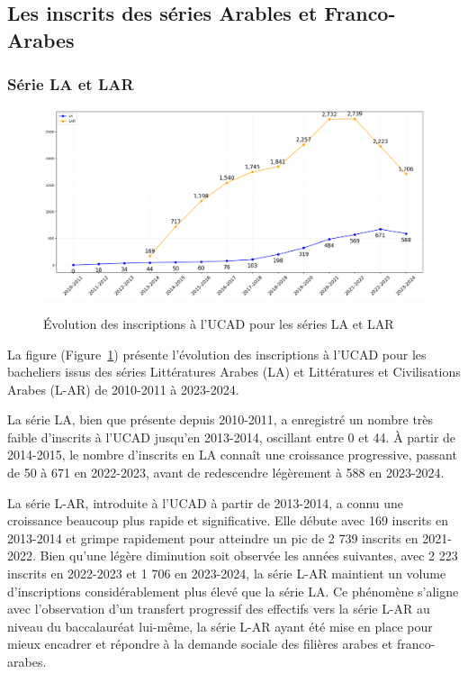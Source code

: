 \newpage
\subsection{Les inscrits des séries Arables et Franco-Arabes}

\subsubsection{Série LA et LAR}

\begin{figure}[ht]
\centering
\caption{Évolution des inscriptions à l'UCAD pour les séries LA et LAR}
\includegraphics[width=1\textwidth]{figure/Inscrits_ucad_LA_LAR.png}
\label{fig:inscrits_ucad_la_lar}
\end{figure}

La figure (Figure~\ref{fig:inscrits_ucad_la_lar}) présente l'évolution des inscriptions à l'UCAD pour les bacheliers issus des séries Littératures Arabes (LA) et Littératures et Civilisations Arabes (L-AR) de 2010-2011 à 2023-2024.

La série LA, bien que présente depuis 2010-2011, a enregistré un nombre très faible d'inscrits à l'UCAD jusqu'en 2013-2014, oscillant entre 0 et 44. 
À partir de 2014-2015, le nombre d'inscrits en LA connaît une croissance progressive, passant de 50 à 671 en 2022-2023, avant de redescendre légèrement à 588 en 2023-2024.

La série L-AR, introduite à l'UCAD à partir de 2013-2014, a connu une croissance beaucoup plus rapide et significative. Elle débute avec 169 inscrits en 2013-2014 et grimpe rapidement pour atteindre un pic de 2 739 inscrits en 2021-2022. 
Bien qu'une légère diminution soit observée les années suivantes, avec 2 223 inscrits en 2022-2023 et 1 706 en 2023-2024, la série L-AR maintient un volume d'inscriptions considérablement plus élevé que la série LA. 
Ce phénomène s'aligne avec l'observation d'un transfert progressif des effectifs vers la série L-AR au niveau du baccalauréat lui-même, la série L-AR ayant été mise en place pour mieux encadrer et répondre à la demande sociale des filières arabes et franco-arabes. 

